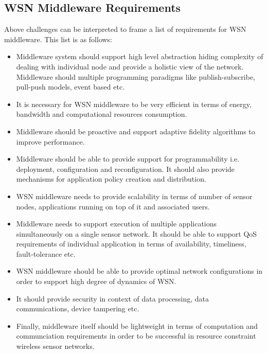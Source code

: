 \subsection{WSN Middleware Requirements}
Above challenges can be interpreted to frame a
list of requirements for WSN middleware. This
list is as follows:
\begin{itemize}
  \item Middleware system should support
  high level abstraction hiding complexity of 
 dealing with individual node and provide a
 holistic view of the network. Middleware should
 multiple programming paradigms like
 publish-subscribe, pull-push models, event based
 etc.
 \item It is necessary for WSN middleware to be
 very efficient in terms of energy, bandwidth and
 computational resources consumption. 
 \item Middleware should be proactive and support
 adaptive fidelity algorithms to improve
 performance.
 \item Middleware should be able to provide
 support for programmability i.e. deployment,
 configuration and reconfiguration. It should
 also provide mechanisms for application policy
 creation and distribution.
 \item WSN middleware needs to provide
 scalability in terms of number of sensor nodes,
 applications running on top of it and associated
 users.
 \item Middleware needs to support execution of
 multiple applications simultaneously on a single
 sensor network. It should be able to support QoS
 requirements of individual application in terms
 of availability, timeliness, fault-tolerance etc.
 \item WSN middleware should be able to provide
 optimal network configurations in order to
 support high degree of dynamics of WSN. 
 \item It should provide security in context of
 data processing, data communications, device
 tampering etc.
 \item Finally, middleware itself should be
 lightweight in terms of computation and
 communciation requirements in order to be
 successful in resource constraint wireless
 sensor networks.
\end{itemize}

